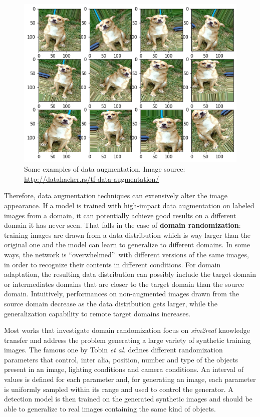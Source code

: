 \documentclass[%
    corpo=12pt,
    twoside,
    stile=classica,   
    tipotesi=magistrale,
    evenboxes,
    english,
	numerazioneromana,
]{toptesi}
\begin{document}
\begin{figure}[ht!]
	\centering
	\includegraphics[width=0.8\linewidth]{imgs/augmentation.png}
	\caption[Some examples of data augmentation]{Some examples of data augmentation. Image source: \url{http://datahacker.rs/tf-data-augmentation/}}
	\label{fig:augmentation}
\end{figure}

Therefore, data augmentation techniques can extensively alter the image appearance. If a model is trained with high-impact data augmentation on labeled images from a domain, it can potentially achieve good results on a different domain it has never seen. That falls in the case of \textbf{domain randomization}: training images are drawn from a data distribution which is way larger than the original one and the model can learn to generalize to different domains. In some ways, the network is \textquotedblleft overwhelmed\textquotedblright~with different versions of the same images, in order to recognize their contents in different conditions. For domain adaptation, the resulting data distribution can possibly include the target domain or intermediates domains that are closer to the target domain than the source domain. Intuitively, performances on non-augmented images drawn from the source domain decrease as the data distribution gets larger, while the generalization capability to remote target domains increases.

\bigskip
Most works that investigate domain randomization focus on \textit{sim2real} knowledge transfer and address the problem generating a large variety of synthetic training images. The famous one by Tobin \textit{et al.}\cite{tobin2017domain} defines different randomization parameters that control, inter alia, position, number and type of the objects present in an image, lighting conditions and camera conditions. An interval of values is defined for each parameter and, for generating an image, each parameter is uniformly sampled within its range and used to control the generator. A detection model is then trained on the generated synthetic images and should be able to generalize to real images containing the same kind of objects.
\end{document}

